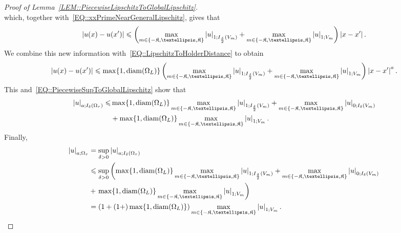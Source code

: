 \documentclass[10pt,a4paper]{amsart}
\makeatletter
\newcommand{\abs}[1]{\left\lvert#1\right\rvert}
\newcommand{\constapp}[1]{%
  \csname constapp@#1\endcsname%
}
\renewcommand{\leq}{\leqslant}
\makeatother
\begin{document}
\begin{proof}[Proof of Lemma~\ref{LEM::PiecewiseLipschitzToGlobalLipschitz}]
\begin{equation}
    \end{equation}
    which, together with~\eqref{EQ::xxPrimeNearGeneralLipschitz}, gives that
    \begin{equation}\label{EQ::LipschitzEstimateNegativeB}
        |u(x)-u(x^\prime)| \leq \left(\max_{m \in \{-\mathfrak{K},\dots,\mathfrak{K}\}} \abs{u}_{1; I_{\frac{\delta}{2}}(V_m)} + \constapp{CONST::Quasiconvexity} \max_{m \in \{-\mathfrak{K},\dots,\mathfrak{K}\}}\abs{u}_{1; V_{m}}\right)\abs{x-x^\prime}.
    \end{equation}
    We combine this new information with~\eqref{EQ::LipschitzToHolderDistance} to obtain
    \begin{equation}
        |u(x)-u(x^\prime)| \leq \max\{1,\operatorname{diam}(\Omega_L)\}\left(\max_{m \in \{-\mathfrak{K},\dots,\mathfrak{K}\}} \abs{u}_{1; I_{\frac{\delta}{2}}(V_m)} + \constapp{CONST::Quasiconvexity} \max_{m \in \{-\mathfrak{K},\dots,\mathfrak{K}\}}\abs{u}_{1; V_{m}}\right)\abs{x-x^\prime}^a.
    \end{equation}
    This and~\eqref{EQ::PiecewiseSupToGlobalLipschitz} show that
    \begin{equation}\begin{split}
            \abs{u}_{a; I_\delta(\Omega_\tau)} \leq &\max\{1,\operatorname{diam}(\Omega_L)\}\max_{m \in \{-\mathfrak{K},\dots,\mathfrak{K}\}} \abs{u}_{1; I_{\frac{\delta}{2}}(V_m)} + \max_{m \in \{-\mathfrak{K},\dots,\mathfrak{K}\}}\abs{u}_{0;I_\delta(V_m)}\\
                &+ \constapp{CONST::Quasiconvexity} \max\{1,\operatorname{diam}(\Omega_L)\}\max_{m \in \{-\mathfrak{K},\dots,\mathfrak{K}\}}\abs{u}_{1; V_{m}}.
        \end{split}
    \end{equation}
    Finally,
    \begin{equation}\label{EQ::HolderStitchingBetaLipschitz}
        \begin{split}
            \abs{u}_{a; \Omega_\tau} &= \sup_{\delta > 0} \abs{u}_{a; I_\delta(\Omega_\tau)}\\
                &\leq \sup_{\delta > 0}\left(\max\{1,\operatorname{diam}(\Omega_L)\}\max_{m \in \{-\mathfrak{K},\dots,\mathfrak{K}\}} \abs{u}_{1; I_{\frac{\delta}{2}}(V_m)} + \max_{m \in \{-\mathfrak{K},\dots,\mathfrak{K}\}}\abs{u}_{0;I_\delta(V_m)}\right.\\
                &+ \left.\constapp{CONST::Quasiconvexity} \max\{1,\operatorname{diam}(\Omega_L)\}\max_{m \in \{-\mathfrak{K},\dots,\mathfrak{K}\}}\abs{u}_{1; V_{m}}\right)\\
                &= \left(1+(1+\constapp{CONST::Quasiconvexity}) \max\{1,\operatorname{diam}(\Omega_L)\}\right)\max_{m \in \{-\mathfrak{K},\dots,\mathfrak{K}\}}\abs{u}_{1; V_{m}}.
        \end{split}
    \end{equation}


\end{proof}
\end{document}
